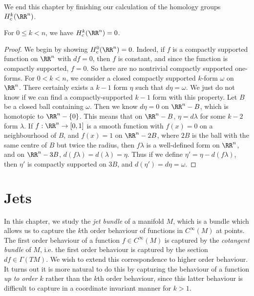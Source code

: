 We end this chapter by finishing our calculation of the homology groups $H^k_c(\RR^n)$.

\begin{theorem}
    For $0 \leq k < n$, we have $H^k_c(\RR^n) = 0$.
\end{theorem}
\begin{proof}
    We begin by showing $H^0_c(\RR^n) = 0$. Indeed, if $f$ is a compactly supported function on $\RR^n$ with $df = 0$, then $f$ is constant, and since the function is compactly supported, $f = 0$. So there are no nontrivial compactly supported one-forms. For $0 < k < n$, we consider a closed compactly supported $k$-form $\omega$ on $\RR^n$. There certainly exists a $k-1$ form $\eta$ such that $d\eta = \omega$. We just do not know if we can find a compactly-supported $k-1$ form with this property. Let $B$ be a closed ball containing $\omega$. Then we know $d\eta = 0$ on $\RR^n - B$, which is homotopic to $\RR^n - \{ 0 \}$. This means that on $\RR^n - B$, $\eta = d\lambda$ for some $k-2$ form $\lambda$. If $f: \RR^n \to [0,1]$ is a smooth function with $f(x) = 0$ on a neighbourhood of $B$, and $f(x) = 1$ on $\RR^n - 2B$, where $2B$ is the ball with the same centre of $B$ but twice the radius, then $f \lambda$ is a well-defined form on $\RR^n$, and on $\RR^n - 3B$, $d(f\lambda) = d(\lambda) = \eta$. Thus if we define $\eta' = \eta - d(f\lambda)$, then $\eta'$ is compactly supported on $3B$, and $d(\eta') = d\eta = \omega$.
\end{proof}






\chapter{Jets}

In this chapter, we study the \emph{jet bundle} of a manifold $M$, which is a bundle which allows us to capture the $k$th order behaviour of functions in $C^\infty(M)$ at points. The first order behaviour of a function $f \in C^\infty(M)$ is captured by the \emph{cotangent bundle} of $M$, i.e. the first order behaviour is captured by the section $df \in \Gamma(TM)$. We wish to extend this correspondence to higher order behaviour. It turns out it is more natural to do this by capturing the behaviour of a function \emph{up to order $k$} rather than the $k$th order behaviour, since this latter behaviour is difficult to capture in a coordinate invariant manner for $k > 1$.

